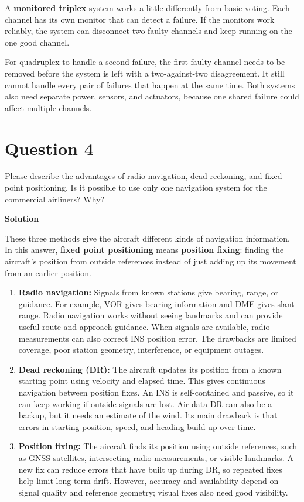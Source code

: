 \documentclass[12pt,a4paper]{article}
\begin{document}
A \textbf{monitored triplex} system works a little differently from basic voting. Each channel has its own monitor that can detect a failure. If the monitors work reliably, the system can disconnect two faulty channels and keep running on the one good channel.

For quadruplex to handle a second failure, the first faulty channel needs to be removed before the system is left with a two-against-two disagreement. It still cannot handle every pair of failures that happen at the same time. Both systems also need separate power, sensors, and actuators, because one shared failure could affect multiple channels.
\newpage
\section*{Question 4}
Please describe the advantages of radio navigation, dead reckoning, and fixed point positioning. Is it possible to use only one navigation system for the commercial airliners? Why?

\textbf{Solution}

These three methods give the aircraft different kinds of navigation information. In this answer, \textbf{fixed point positioning} means \textbf{position fixing}: finding the aircraft's position from outside references instead of just adding up its movement from an earlier position.

\begin{enumerate}
\item \textbf{Radio navigation:} Signals from known stations give bearing, range, or guidance. For example, VOR gives bearing information and DME gives slant range. Radio navigation works without seeing landmarks and can provide useful route and approach guidance. When signals are available, radio measurements can also correct INS position error. The drawbacks are limited coverage, poor station geometry, interference, or equipment outages.
\item \textbf{Dead reckoning (DR):} The aircraft updates its position from a known starting point using velocity and elapsed time. This gives continuous navigation between position fixes. An INS is self-contained and passive, so it can keep working if outside signals are lost. Air-data DR can also be a backup, but it needs an estimate of the wind. Its main drawback is that errors in starting position, speed, and heading build up over time.
\item \textbf{Position fixing:} The aircraft finds its position using outside references, such as GNSS satellites, intersecting radio measurements, or visible landmarks. A new fix can reduce errors that have built up during DR, so repeated fixes help limit long-term drift. However, accuracy and availability depend on signal quality and reference geometry; visual fixes also need good visibility.
\end{enumerate}
\end{document}
